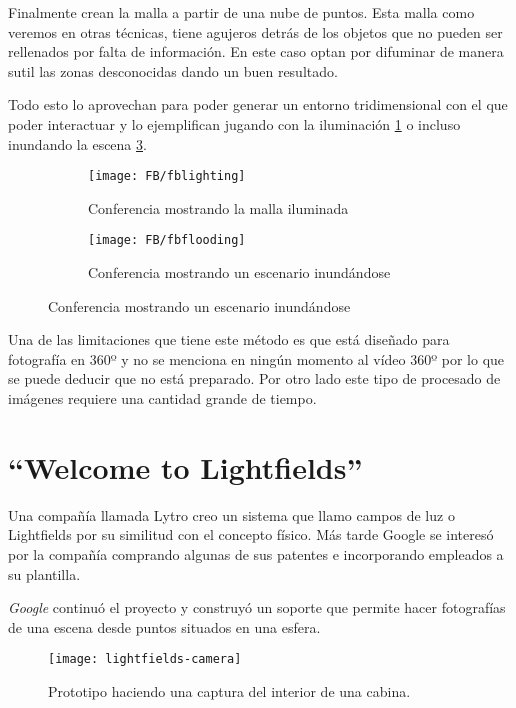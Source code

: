 Finalmente crean la malla a partir de una nube de puntos. Esta malla como veremos en otras técnicas, tiene agujeros detrás de los objetos que no pueden ser rellenados por falta de información. En este caso optan por difuminar de manera sutil las zonas desconocidas dando un buen resultado.

Todo esto lo aprovechan para poder generar un entorno tridimensional con el que poder interactuar y lo ejemplifican jugando con la iluminación \ref{fig:fblighting-example} o incluso inundando la escena \ref{fig:fbflooding-example}.

\begin{figure}[h]
\centering
\begin{subfigure}{.47\linewidth}
	\centering
	\texttt{[image: FB/fblighting]}
  \caption{Conferencia mostrando la malla iluminada}
  \label{fig:fblighting-example}
\end{subfigure}%
\hspace{.05\linewidth}
\begin{subfigure}{.47\linewidth}
	\centering
	\texttt{[image: FB/fbflooding]}
  \caption{Conferencia mostrando un escenario inundándose}
  \label{fig:fbflooding-example}
\end{subfigure}
\end{figure}

Una de las limitaciones que tiene este método es que está diseñado para fotografía en 360º y no se menciona en ningún momento al vídeo 360º por lo que se puede deducir que no está preparado. Por otro lado este tipo de procesado de imágenes requiere una cantidad grande de tiempo.

\section{``Welcome to Lightfields''}
Una compañía llamada Lytro creo un sistema que llamo campos de luz o Lightfields \cite{LytroLightfields} por su similitud con el concepto físico. Más tarde Google se interesó por la compañía comprando algunas de sus patentes e incorporando empleados a su plantilla.

\textit{Google} continuó el proyecto \cite{GoogleLightfields} y construyó un soporte que permite hacer fotografías de una escena desde puntos situados en una esfera.

\begin{figure}[h]
  \centering
	\texttt{[image: lightfields-camera]}
  \caption{Prototipo haciendo una captura del interior de una cabina.}
  \label{fig:lightfields-camera}
\end{figure}

